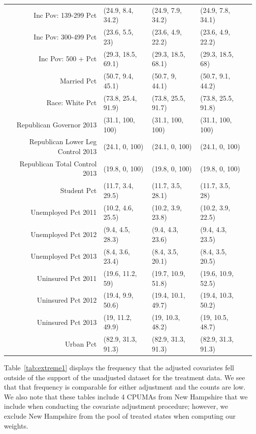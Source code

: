\begin{table}[h!]
\begin{tabular}{rllll}
  Inc Pov: 139-299 Pct & (24.9, 8.4, 34.2) & (24.9, 7.9, 34.2) & (24.9, 7.8, 34.1) \\ 
  Inc Pov: 300-499 Pct & (23.6, 5.5, 23) & (23.6, 4.9, 22.2) & (23.6, 4.9, 22.2) \\ 
  Inc Pov: 500 + Pct & (29.3, 18.5, 69.1) & (29.3, 18.5, 68.1) & (29.3, 18.5, 68) \\ 
  Married Pct & (50.7, 9.4, 45.1) & (50.7, 9, 44.1) & (50.7, 9.1, 44.2) \\ 
  Race: White Pct & (73.8, 25.4, 91.9) & (73.8, 25.5, 91.7) & (73.8, 25.5, 91.8) \\ 
  Republican Governor 2013 & (31.1, 100, 100) & (31.1, 100, 100) & (31.1, 100, 100) \\ 
  Republican Lower Leg Control 2013 & (24.1, 0, 100) & (24.1, 0, 100) & (24.1, 0, 100) \\ 
  Republican Total Control 2013 & (19.8, 0, 100) & (19.8, 0, 100) & (19.8, 0, 100) \\ 
Student Pct & (11.7, 3.4, 29.5) & (11.7, 3.5, 28.1) & (11.7, 3.5, 28) \\ 
  Unemployed Pct 2011 & (10.2, 4.6, 25.5) & (10.2, 3.9, 23.8) & (10.2, 3.9, 22.5) \\ 
  Unemployed Pct 2012 & (9.4, 4.5, 28.3) & (9.4, 4.3, 23.6) & (9.4, 4.3, 23.5) \\ 
  Unemployed Pct 2013 & (8.4, 3.6, 23.4) & (8.4, 3.5, 20.1) & (8.4, 3.5, 20.5) \\ 
  Uninsured Pct 2011 & (19.6, 11.2, 59) & (19.7, 10.9, 51.8) & (19.6, 10.9, 52.5) \\ 
  Uninsured Pct 2012 & (19.4, 9.9, 50.6) & (19.4, 10.1, 49.7) & (19.4, 10.3, 50.2) \\ 
  Uninsured Pct 2013 & (19, 11.2, 49.9) & (19, 10.3, 48.2) & (19, 10.5, 48.7) \\ 
  Urban Pct & (82.9, 31.3, 91.3) & (82.9, 31.3, 91.3) & (82.9, 31.3, 91.3) \\ 
   \hline
\end{tabular}
\end{table}

Table~\ref{tab:extreme1} displays the frequency that the adjusted covariates fell outside of the support of the unadjusted dataset for the treatment data. We see that that frequency is comparable for either adjustment and the counts are low. We also note that these tables include 4 CPUMAs from New Hampshire that we include when conducting the covariate adjustment procedure; however, we exclude New Hampshire from the pool of treated states when computing our weights.

